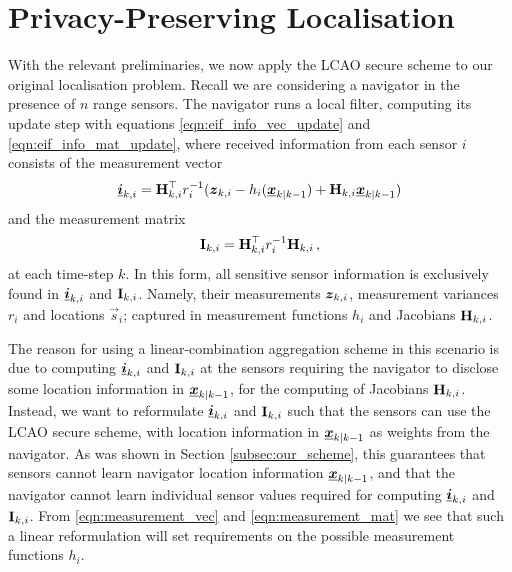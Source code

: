 \documentclass[10pt,journal,compsoc]{IEEEtran}
\theoremstyle{definition}
\theoremstyle{definition}
\theoremstyle{remark}
\begin{document}
% 
%                                
%                                
%                                
% 

\section{Privacy-Preserving Localisation} \label{sec:priv_localisation}
With the relevant preliminaries, we now apply the LCAO secure scheme to our original localisation problem. Recall we are considering a navigator in the presence of $n$ range sensors. The navigator runs a local filter, computing its update step with equations \eqref{eqn:eif_info_vec_update} and \eqref{eqn:eif_info_mat_update}, where received information from each sensor $i$ consists of the measurement vector
\begin{equation}
    \rvec{i}_{k,i} = \mat{H}^\top_{k,i} r^{-1}_i (\rv{z}_{k,i} - h_i(\rvec{x}_{k|k-1}) + \mat{H}_{k,i}\rvec{x}_{k|k-1}) \label{eqn:measurement_vec}
\end{equation}
and the measurement matrix
\begin{equation}
    \mat{I}_{k,i} = \mat{H}^\top_{k,i} r^{-1}_i \mat{H}_{k,i}\,, \label{eqn:measurement_mat}
\end{equation}
at each time-step $k$. In this form, all sensitive sensor information is exclusively found in ${\boldsymbol{\underline{i}}}_{k,i}$ and ${{\mathbf{I}}}_{k,i}$. Namely, their measurements ${\boldsymbol{z}}_{k,i}$, measurement variances $r_i$ and locations $\vec{s}_i$; captured in measurement functions $h_i$ and Jacobians ${{\mathbf{H}}}_{k,i}$. 

The reason for using a linear-combination aggregation scheme in this scenario is due to computing ${\boldsymbol{\underline{i}}}_{k,i}$ and ${{\mathbf{I}}}_{k,i}$ at the sensors requiring the navigator to disclose some location information in ${\boldsymbol{\underline{x}}}_{k|k-1}$, for the computing of Jacobians ${{\mathbf{H}}}_{k,i}$. Instead, we want to reformulate ${\boldsymbol{\underline{i}}}_{k,i}$ and ${{\mathbf{I}}}_{k,i}$ such that the sensors can use the LCAO secure scheme, with location information in ${\boldsymbol{\underline{x}}}_{k|k-1}$ as weights from the navigator. As was shown in Section \ref{subsec:our_scheme}, this guarantees that sensors cannot learn navigator location information ${\boldsymbol{\underline{x}}}_{k|k-1}$, and that the navigator cannot learn individual sensor values required for computing ${\boldsymbol{\underline{i}}}_{k,i}$ and ${{\mathbf{I}}}_{k,i}$. From \eqref{eqn:measurement_vec} and \eqref{eqn:measurement_mat} we see that such a linear reformulation will set requirements on the possible measurement functions $h_i$. 
\end{document}
